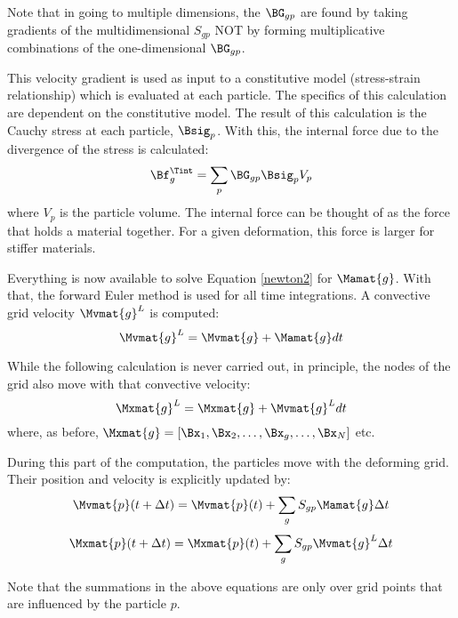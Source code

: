 \begin{NoteBox}
Note that in going to multiple 
dimensions, the $\BG_{gp}$ are found by taking gradients of the multidimensional
$S_{gp}$ NOT by forming multiplicative combinations of the one-dimensional
$\BG_{gp}$.
\end{NoteBox}

This velocity gradient is used as input to a constitutive model 
(stress-strain relationship) which is evaluated at each particle.  The 
specifics of this calculation are dependent on the constitutive model.  
The result of this calculation is the Cauchy stress at each particle, $\Bsig_p$.  
With this, the internal force due to the divergence of the stress is 
calculated:
\begin{equation}
  \Bf_g^\Tint = \sum_{p} \BG_{gp} \Bsig_p V_p
\end{equation}
where $V_p$ is the particle volume.  The internal force can be 
thought of as the force that holds a material together.  For a 
given deformation, this force is larger for stiffer materials.

Everything is now available to solve Equation \ref{newton2} for 
$\Mamat{g}$. With that, the forward Euler method is used for all time 
integrations. A convective grid velocity $\Mvmat{g}^L$ is computed:
\begin{equation}
  \Mvmat{g}^L = \Mvmat{g}  + \Mamat{g} dt
\end{equation}

While the following calculation is never carried out, in 
principle, the nodes of the grid also move with that convective velocity:
\begin{equation}
  \Mxmat{g}^L = \Mxmat{g}  + \Mvmat{g}^L dt     
\label{expdefgrid}
\end{equation}
where, as before, $\Mxmat{g} = [\Bx_1, \Bx_2, \dots, \Bx_g, \dots, \Bx_N]$ etc.

During this part of the computation, the particles move with the 
deforming grid.  Their position and velocity is explicitly updated by:
\begin{equation}
  \Mvmat{p} (t + \Delta t)  = \Mvmat{p} (t)  + \sum_{g} S_{gp} \Mamat{g}  \Delta t
\end{equation}
\begin{equation}
  \Mxmat{p} (t + \Delta t)  = \Mxmat{p} (t)  + \sum_{g} S_{gp} \Mvmat{g}^L  \Delta t
\end{equation}
\begin{NoteBox}
Note that the summations in the above equations are only over grid points
that are influenced by the particle $p$.
\end{NoteBox}

